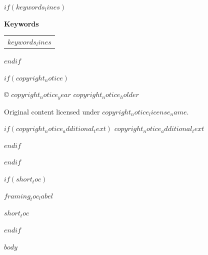 \documentclass[11pt]{article}
\begin{document}
$if(keywords_lines)$
\vspace{0.25in}

\begin{center}
{\Large \headingfont\bfseries\color{headingcolor} Keywords}
\end{center}

\vspace{0.1in}

\begin{center}
\normalsize
\renewcommand{\arraystretch}{1.15}
\begin{tabular}{l}
$keywords_lines$
\end{tabular}
\end{center}
$endif$

\vspace*{\fill}

$if(copyright_notice)$
\begin{center}
\footnotesize
\setlength{\parskip}{0pt}
© $copyright_notice_year$ $copyright_notice_holder$\par
Original content licensed under \href{$copyright_notice_license_url$}{$copyright_notice_license_name$}.\par
$if(copyright_notice_additional_text)$
$copyright_notice_additional_text$\par
$endif$
\end{center}
$endif$

\newpage

$if(short_toc)$
\thispagestyle{empty}
\vspace*{0.15in}

\begin{center}
{\Large \headingfont\bfseries\color{headingcolor} $framing_toc_label$}
\end{center}

\vspace{0.2in}

$short_toc$

\vspace*{\fill}

\newpage
$endif$

\normalsize
{}
\setlength{\parskip}{1.05em}

$body$
\end{document}
